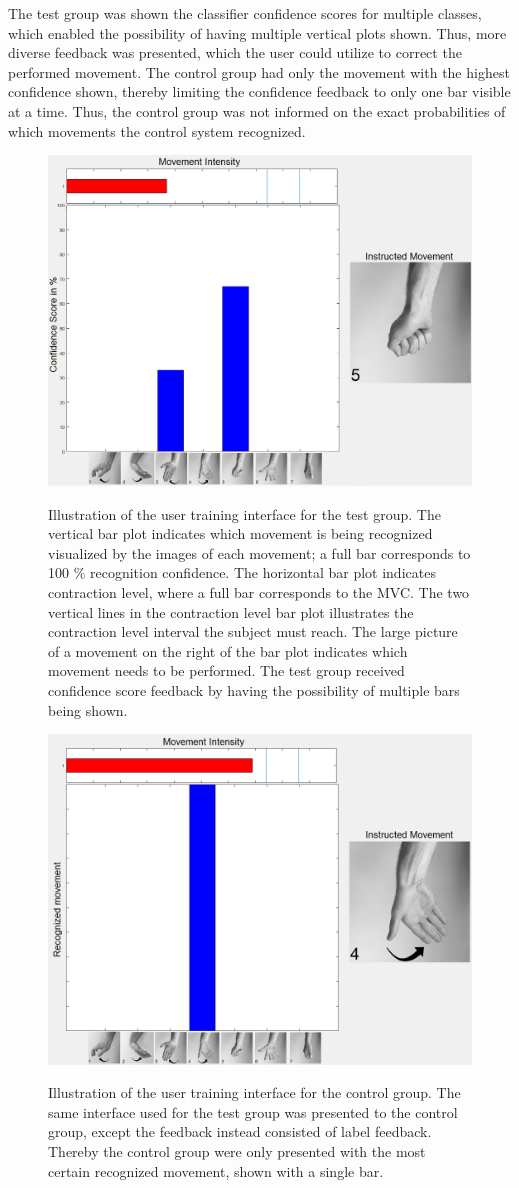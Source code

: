 The test group was shown the classifier confidence scores for multiple classes, which enabled the possibility of having multiple vertical plots shown. Thus, more diverse feedback was presented, which the user could utilize to correct the performed movement. The control group had only the movement with the highest confidence shown, thereby limiting the confidence feedback to only one bar visible at a time. Thus, the control group was not informed on the exact probabilities of which movements the control system recognized.  
\begin{figure}[H]
	\includegraphics[width=.47\textwidth]{figures/xBackground/usertraintestGUI} \\
	\caption{Illustration of the user training interface for the test group. The vertical bar plot indicates which movement is being recognized visualized by the images of each movement; a full bar corresponds to 100 \% recognition confidence. The horizontal bar plot indicates contraction level, where a full bar corresponds to the MVC. The two vertical lines in the contraction level bar plot illustrates the contraction level interval the subject must reach. The large picture of a movement on the right of the bar plot indicates which movement needs to be performed. The test group received confidence score feedback by having the possibility of multiple bars being shown.}
	\label{fig:test}
\end{figure}    
\begin{figure}[H]
	\includegraphics[width=.47\textwidth]{figures/xBackground/usertraincontrolGUI} \\
	\caption{Illustration of the user training interface for the control group. The same interface used for the test group was presented to the control group, except the feedback instead consisted of label feedback. Thereby the control group were only presented with the most certain recognized movement, shown with a single bar.}
	\label{fig:control}
\end{figure}  

